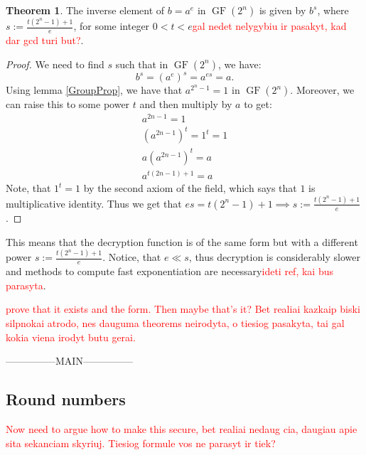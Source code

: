 \documentclass{Resources/UoBLab1}
\theoremstyle{definition}
\newtheorem{theorem}{Theorem}[section]
\begin{document}
\begin{theorem}
    The inverse element of $b = a^e$ in $\operatorname{GF}(2^n)$ is given by $b^s$, where $s := \frac{t(2^n-1) + 1}{e}$, for some integer $0 < t < e$\textcolor{red}{gal nedet nelygybiu ir pasakyt, kad dar gcd turi but?}.
\end{theorem}
\begin{proof}
    We need to find $s$ such that in $\operatorname{GF}(2^n)$, we have:
    \[
        b^s = (a^e)^s = a^{es} = a.
    \]
    Using lemma \ref{GroupProp}, we have that $a^{2^n-1} = 1$ in $\operatorname{GF}(2^n)$. Moreover, we can raise this to some power $t$ and then multiply by $a$ to get:
    \begin{gather*}
        a^{2n-1} = 1\\
        (a^{2n-1}) ^ t = 1^t = 1\\
        a (a^{2n-1})^t = a\\
        a^{t(2n-1)+1} = a
    \end{gather*}
    Note, that $1^t=1$ by the second axiom of the field, which says that $1$ is multiplicative identity. Thus we get that \(es = t(2^n-1)+1 \implies s := \frac{t(2^n-1)+1}{e}\).
\end{proof}
This means that the decryption function is of the same form but with a different power $s := \frac{t(2^n-1)+1}{e}$. Notice, that $e \ll s$, thus decryption is considerably slower and methods to compute fast exponentiation are necessary\textcolor{red}{ideti ref, kai bus parasyta}.

\textcolor{red}{prove that it exists and the form. Then maybe that's it? Bet realiai kazkaip biski silpnokai atrodo, nes dauguma theorems neirodyta, o tiesiog pasakyta, tai gal kokia viena irodyt butu gerai.}

---------------MAIN---------------

\subsection{Round numbers}\label{sub2.3}
\textcolor{red}{Now need to argue how to make this secure, bet realiai nedaug cia, daugiau apie sita sekanciam skyriuj. Tiesiog formule vos ne parasyt ir tiek?}

\end{document}

